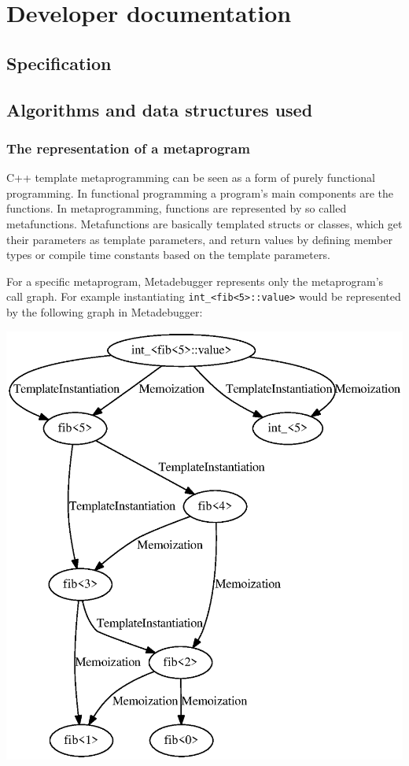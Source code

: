 
\chapter{Developer documentation}

\section{Specification}

\section{Algorithms and data structures used}

\subsection{The representation of a metaprogram}

C++ template metaprogramming can be seen as a form of purely functional
programming.\cite{mihalicza-phd} In functional programming a program's main
components are the functions. In metaprogramming, functions are represented by
so called metafunctions. Metafunctions are basically templated structs or
classes, which get their parameters as template parameters, and return values
by defining member types or compile time constants based on the template
parameters.

For a specific metaprogram, Metadebugger represents only the metaprogram's call
graph. For example instantiating \verb|int_<fib<5>::value>| would be
represented by the following graph in Metadebugger:

\includegraphics[width=\textwidth]{img/fib5_call_graph.eps}

